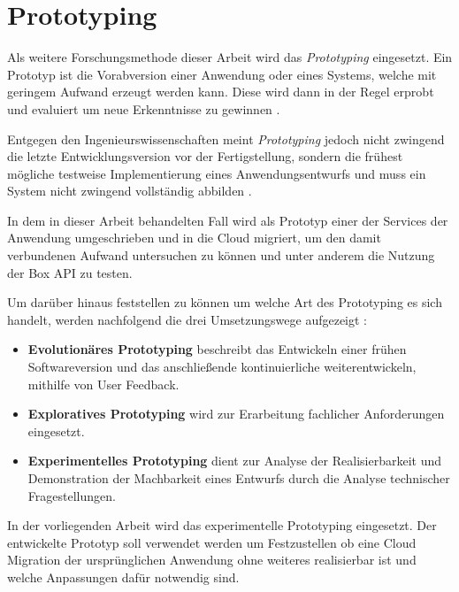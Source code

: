 \section{Prototyping}

Als weitere Forschungsmethode dieser Arbeit wird das \textit{Prototyping} eingesetzt. Ein Prototyp ist die Vorabversion einer Anwendung oder eines Systems, welche mit geringem Aufwand erzeugt werden kann. Diese wird dann in der Regel erprobt und evaluiert um neue Erkenntnisse zu gewinnen \cite[Vgl.][S. 282]{Wilde2007}\cite[Vgl.][S. 114]{Heinrich2011}.

Entgegen den Ingenieurswissenschaften meint \textit{Prototyping} jedoch nicht zwingend die letzte Entwicklungsversion vor der Fertigstellung, sondern die frühest mögliche testweise Implementierung eines Anwendungsentwurfs \cite[Vgl.][S. 114]{Heinrich2011} und muss ein System nicht zwingend vollständig abbilden \cite[Vgl.][S. 119]{Heinrich2011}.

In dem in dieser Arbeit behandelten Fall wird als Prototyp einer der Services der Anwendung umgeschrieben und in die Cloud migriert, um den damit verbundenen Aufwand untersuchen zu können und unter anderem die Nutzung der Box \ac{API} zu testen.

Um darüber hinaus feststellen zu können um welche Art des Prototyping es sich handelt, werden nachfolgend die drei Umsetzungswege aufgezeigt \cite[Vgl. auch im Folgenden][S. 370]{Alpar2019}:
\begin{itemize}
    \item \textbf{Evolutionäres Prototyping} beschreibt das Entwickeln einer frühen Softwareversion und das anschließende kontinuierliche weiterentwickeln, mithilfe von User Feedback.
    \item \textbf{Exploratives Prototyping} wird zur Erarbeitung fachlicher Anforderungen eingesetzt.
    \item \textbf{Experimentelles Prototyping} dient zur Analyse der Realisierbarkeit und Demonstration der Machbarkeit eines Entwurfs durch die Analyse technischer Fragestellungen.
\end{itemize}

In der vorliegenden Arbeit wird das experimentelle Prototyping eingesetzt. Der entwickelte Prototyp soll verwendet werden um Festzustellen ob eine Cloud Migration der ursprünglichen Anwendung ohne weiteres realisierbar ist und welche Anpassungen dafür notwendig sind.